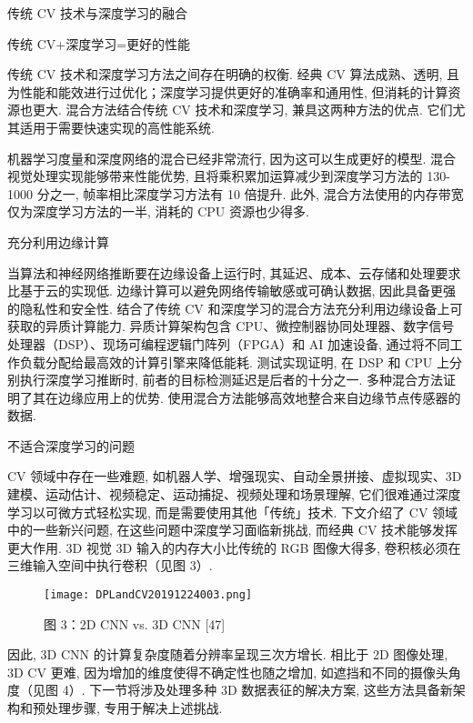传统 CV 技术与深度学习的融合

传统 CV+深度学习=更好的性能

传统 CV 技术和深度学习方法之间存在明确的权衡. 经典 CV 算法成熟、透明, 且为性能和能效进行过优化；深度学习提供更好的准确率和通用性, 但消耗的计算资源也更大.
混合方法结合传统 CV 技术和深度学习, 兼具这两种方法的优点. 它们尤其适用于需要快速实现的高性能系统.

机器学习度量和深度网络的混合已经非常流行, 因为这可以生成更好的模型. 混合视觉处理实现能够带来性能优势, 且将乘积累加运算减少到深度学习方法的 130-1000 分之一, 帧率相比深度学习方法有 10 倍提升. 此外, 混合方法使用的内存带宽仅为深度学习方法的一半, 消耗的 CPU 资源也少得多.

充分利用边缘计算

当算法和神经网络推断要在边缘设备上运行时, 其延迟、成本、云存储和处理要求比基于云的实现低. 边缘计算可以避免网络传输敏感或可确认数据, 因此具备更强的隐私性和安全性.
结合了传统 CV 和深度学习的混合方法充分利用边缘设备上可获取的异质计算能力. 异质计算架构包含 CPU、微控制器协同处理器、数字信号处理器（DSP）、现场可编程逻辑门阵列（FPGA）和 AI 加速设备, 通过将不同工作负载分配给最高效的计算引擎来降低能耗. 测试实现证明, 在 DSP 和 CPU 上分别执行深度学习推断时, 前者的目标检测延迟是后者的十分之一.
多种混合方法证明了其在边缘应用上的优势. 使用混合方法能够高效地整合来自边缘节点传感器的数据.

不适合深度学习的问题

CV 领域中存在一些难题, 如机器人学、增强现实、自动全景拼接、虚拟现实、3D 建模、运动估计、视频稳定、运动捕捉、视频处理和场景理解, 它们很难通过深度学习以可微方式轻松实现, 而是需要使用其他「传统」技术.
下文介绍了 CV 领域中的一些新兴问题, 在这些问题中深度学习面临新挑战, 而经典 CV 技术能够发挥更大作用.
3D 视觉
3D 输入的内存大小比传统的 RGB 图像大得多, 卷积核必须在三维输入空间中执行卷积（见图 3）.
\begin{figure}[H]
\centering
\texttt{[image: DPLandCV20191224003.png]}
\caption{图 3：2D CNN vs. 3D CNN [47]}
\label{DPLandCV20191224003}
\end{figure}


因此, 3D CNN 的计算复杂度随着分辨率呈现三次方增长. 相比于 2D 图像处理, 3D CV 更难, 因为增加的维度使得不确定性也随之增加, 如遮挡和不同的摄像头角度（见图 4）.
下一节将涉及处理多种 3D 数据表征的解决方案, 这些方法具备新架构和预处理步骤, 专用于解决上述挑战.
